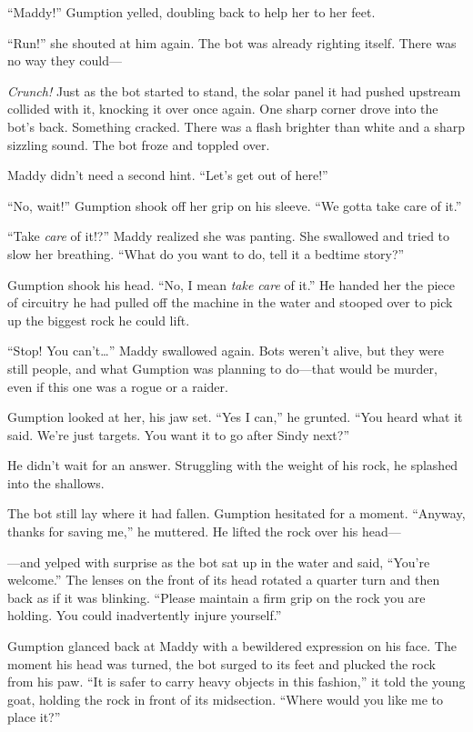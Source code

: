 \documentclass[10pt]{article}
\begin{document}
``Maddy!'' Gumption yelled, doubling back to help her to her feet.

``Run!'' she shouted at him again. The bot was already righting itself.
There was no way they could---

\emph{Crunch!} Just as the bot started to stand, the solar panel it had
pushed upstream collided with it, knocking it over once again. One sharp
corner drove into the bot's back. Something cracked. There was a flash
brighter than white and a sharp sizzling sound. The bot froze and
toppled over.

Maddy didn't need a second hint. ``Let's get out of here!''

``No, wait!'' Gumption shook off her grip on his sleeve. ``We gotta take
care of it.''

``Take \emph{care} of it!?'' Maddy realized she was panting. She
swallowed and tried to slow her breathing. ``What do you want to do,
tell it a bedtime story?''

Gumption shook his head. ``No, I mean \emph{take care} of it.'' He
handed her the piece of circuitry he had pulled off the machine in the
water and stooped over to pick up the biggest rock he could lift.

``Stop! You can't\ldots{}'' Maddy swallowed again. Bots weren't alive,
but they were still people, and what Gumption was planning to do---that
would be murder, even if this one was a rogue or a raider.

Gumption looked at her, his jaw set. ``Yes I can,'' he grunted. ``You
heard what it said. We're just targets. You want it to go after Sindy
next?''

He didn't wait for an answer. Struggling with the weight of his rock, he
splashed into the shallows.

The bot still lay where it had fallen. Gumption hesitated for a moment.
``Anyway, thanks for saving me,'' he muttered. He lifted the rock over
his head---

---and yelped with surprise as the bot sat up in the water and said,
``You're welcome.'' The lenses on the front of its head rotated a
quarter turn and then back as if it was blinking. ``Please maintain a
firm grip on the rock you are holding. You could inadvertently injure
yourself.''

Gumption glanced back at Maddy with a bewildered expression on his face.
The moment his head was turned, the bot surged to its feet and plucked
the rock from his paw. ``It is safer to carry heavy objects in this
fashion,'' it told the young goat, holding the rock in front of its
midsection. ``Where would you like me to place it?''
\end{document}
